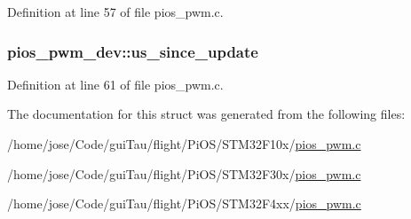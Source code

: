 Definition at line 57 of file pios\-\_\-pwm.\-c.

\hypertarget{structpios__pwm__dev_a7a992a8b90e3ff0cfa62b69a5157e34e}{
\subsubsection[{us\-\_\-since\-\_\-update}]{ pios\-\_\-pwm\-\_\-dev\-::us\-\_\-since\-\_\-update}}\label{structpios__pwm__dev_a7a992a8b90e3ff0cfa62b69a5157e34e}


Definition at line 61 of file pios\-\_\-pwm.\-c.



The documentation for this struct was generated from the following files\-:\begin{DoxyCompactItemize}
\item 
/home/jose/\-Code/gui\-Tau/flight/\-Pi\-O\-S/\-S\-T\-M32\-F10x/\hyperlink{_s_t_m32_f10x_2pios__pwm_8c}{pios\-\_\-pwm.\-c}\item 
/home/jose/\-Code/gui\-Tau/flight/\-Pi\-O\-S/\-S\-T\-M32\-F30x/\hyperlink{_s_t_m32_f30x_2pios__pwm_8c}{pios\-\_\-pwm.\-c}\item 
/home/jose/\-Code/gui\-Tau/flight/\-Pi\-O\-S/\-S\-T\-M32\-F4xx/\hyperlink{_s_t_m32_f4xx_2pios__pwm_8c}{pios\-\_\-pwm.\-c}\end{DoxyCompactItemize}
